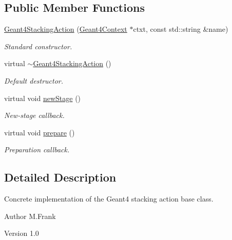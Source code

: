 \subsection*{Public Member Functions}
\begin{DoxyCompactItemize}
\item 
\hyperlink{class_d_d4hep_1_1_simulation_1_1_geant4_stacking_action_a37e43c47abe5ab2fa6f45ffad46fc942}{Geant4StackingAction} (\hyperlink{class_d_d4hep_1_1_simulation_1_1_geant4_context}{Geant4Context} $\ast$ctxt, const std::string \&name)
\begin{DoxyCompactList}\small\item\em Standard constructor. \item\end{DoxyCompactList}\item 
virtual \hyperlink{class_d_d4hep_1_1_simulation_1_1_geant4_stacking_action_a15dd317e760306d51e728b26aebf65a7}{$\sim$Geant4StackingAction} ()
\begin{DoxyCompactList}\small\item\em Default destructor. \item\end{DoxyCompactList}\item 
virtual void \hyperlink{class_d_d4hep_1_1_simulation_1_1_geant4_stacking_action_a2709ba86b13b0574dcd1d8e580209d0b}{newStage} ()
\begin{DoxyCompactList}\small\item\em New-\/stage callback. \item\end{DoxyCompactList}\item 
virtual void \hyperlink{class_d_d4hep_1_1_simulation_1_1_geant4_stacking_action_a3974c0e7b737bdccced8c196fc316b5b}{prepare} ()
\begin{DoxyCompactList}\small\item\em Preparation callback. \item\end{DoxyCompactList}\end{DoxyCompactItemize}


\subsection{Detailed Description}
Concrete implementation of the Geant4 stacking action base class. \begin{DoxyAuthor}{Author}
M.Frank 
\end{DoxyAuthor}
\begin{DoxyVersion}{Version}
1.0 
\end{DoxyVersion}


